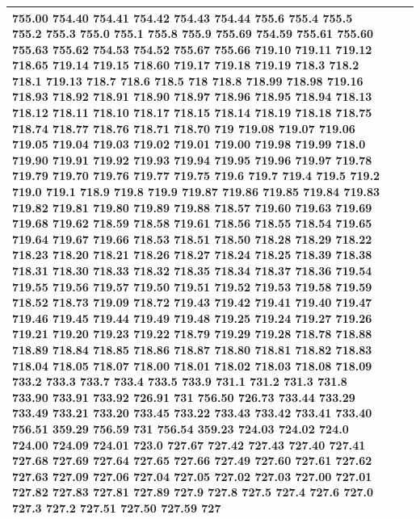\documentclass[3p,super,numbers,sort&compress,preprint,10pt]{elsarticle}
\begin{document}
\begin{longtable}{|L{.1in}|L{.6in}||L{5.65in}|}
755.00 754.40 754.41 754.42 754.43 754.44 755.6 755.4 755.5 755.2 755.3 755.0 755.1 755.8 755.9 755.69 754.59 755.61 755.60 755.63 755.62 754.53 754.52 755.67 755.66 719.10 719.11 719.12 718.65 719.14 719.15 718.60 719.17 719.18 719.19 718.3 718.2 718.1 719.13 718.7 718.6 718.5 718 718.8 718.99 718.98 719.16 718.93 718.92 718.91 718.90 718.97 718.96 718.95 718.94 718.13 718.12 718.11 718.10 718.17 718.15 718.14 718.19 718.18 718.75 718.74 718.77 718.76 718.71 718.70 719 719.08 719.07 719.06 719.05 719.04 719.03 719.02 719.01 719.00 719.98 719.99 718.0 719.90 719.91 719.92 719.93 719.94 719.95 719.96 719.97 719.78 719.79 719.70 719.76 719.77 719.75 719.6 719.7 719.4 719.5 719.2 719.0 719.1 718.9 719.8 719.9 719.87 719.86 719.85 719.84 719.83 719.82 719.81 719.80 719.89 719.88 718.57 719.60 719.63 719.69 719.68 719.62 718.59 718.58 719.61 718.56 718.55 718.54 719.65 719.64 719.67 719.66 718.53 718.51 718.50 718.28 718.29 718.22 718.23 718.20 718.21 718.26 718.27 718.24 718.25 718.39 718.38 718.31 718.30 718.33 718.32 718.35 718.34 718.37 718.36 719.54 719.55 719.56 719.57 719.50 719.51 719.52 719.53 719.58 719.59 718.52 718.73 719.09 718.72 719.43 719.42 719.41 719.40 719.47 719.46 719.45 719.44 719.49 719.48 719.25 719.24 719.27 719.26 719.21 719.20 719.23 719.22 718.79 719.29 719.28 718.78 718.88 718.89 718.84 718.85 718.86 718.87 718.80 718.81 718.82 718.83 718.04 718.05 718.07 718.00 718.01 718.02 718.03 718.08 718.09 733.2 733.3 733.7 733.4 733.5 733.9 731.1 731.2 731.3 731.8 733.90 733.91 733.92 726.91 731 756.50 726.73 733.44 733.29 733.49 733.21 733.20 733.45 733.22 733.43 733.42 733.41 733.40 756.51 359.29 756.59 731 756.54 359.23 724.03 724.02 724.0 724.00 724.09 724.01 723.0 727.67 727.42 727.43 727.40 727.41 727.68 727.69 727.64 727.65 727.66 727.49 727.60 727.61 727.62 727.63 727.09 727.06 727.04 727.05 727.02 727.03 727.00 727.01 727.82 727.83 727.81 727.89 727.9 727.8 727.5 727.4 727.6 727.0 727.3 727.2 727.51 727.50 727.59 727\\\hline

\end{longtable}
\end{document}
